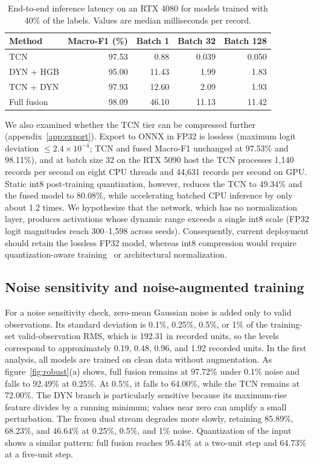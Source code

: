 \documentclass{iopjournal}
\begin{document}
\begin{table}[htbp]
\caption{End-to-end inference latency on an RTX 4080 for models trained with 40\% of the labels. Values are median milliseconds per record.}
\label{tab:latency}
\centering
\begin{tabular}{l r r r r}
\toprule
Method & Macro-F1 (\%) & Batch 1 & Batch 32 & Batch 128 \\
\midrule
TCN & 97.53 & 0.88 & 0.039 & 0.050 \\
DYN + HGB & 95.00 & 11.43 & 1.99 & 1.83 \\
TCN + DYN & 97.93 & 12.60 & 2.09 & 1.93 \\
Full fusion & 98.09 & 46.10 & 11.13 & 11.42 \\
\bottomrule
\end{tabular}
\end{table}

We also examined whether the TCN tier can be compressed further (appendix~\ref{app:export}). Export to ONNX in FP32 is lossless (maximum logit deviation $\le2.4\times10^{-4}$; TCN and fused Macro-F1 unchanged at 97.53\% and 98.11\%), and at batch size 32 on the RTX 5090 host the TCN processes 1,140 records per second on eight CPU threads and 44,631 records per second on GPU. Static int8 post-training quantization, however, reduces the TCN to 49.34\% and the fused model to 80.08\%, while accelerating batched CPU inference by only about 1.2 times. We hypothesize that the network, which has no normalization layer, produces activations whose dynamic range exceeds a single int8 scale (FP32 logit magnitudes reach 300--1,598 across seeds). Consequently, current deployment should retain the lossless FP32 model, whereas int8 compression would require quantization-aware training~\cite{jacob2018} or architectural normalization.

\subsection{Noise sensitivity and noise-augmented training}\label{sec:noise}

For a noise sensitivity check, zero-mean Gaussian noise is added only to valid observations. Its standard deviation is 0.1\%, 0.25\%, 0.5\%, or 1\% of the training-set valid-observation RMS, which is 192.31 in recorded units, so the levels correspond to approximately 0.19, 0.48, 0.96, and 1.92 recorded units. In the first analysis, all models are trained on clean data without augmentation. As figure~\ref{fig:robust}(a) shows, full fusion remains at 97.72\% under 0.1\% noise and falls to 92.49\% at 0.25\%. At 0.5\%, it falls to 64.00\%, while the TCN remains at 72.00\%. The DYN branch is particularly sensitive because its maximum-rise feature divides by a running minimum; values near zero can amplify a small perturbation. The frozen dual stream degrades more slowly, retaining 85.89\%, 68.23\%, and 46.64\% at 0.25\%, 0.5\%, and 1\% noise. Quantization of the input shows a similar pattern: full fusion reaches 95.44\% at a two-unit step and 64.73\% at a five-unit step.
\end{document}

